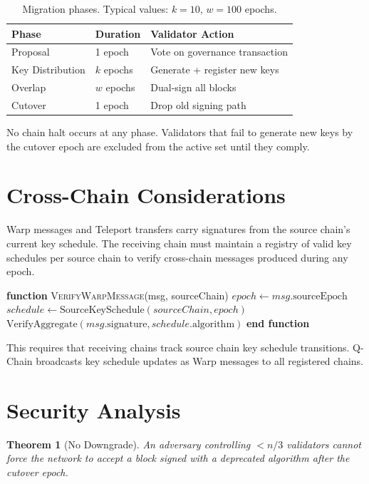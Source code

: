 \documentclass[11pt]{article}
\newtheorem{theorem}{Theorem}
\begin{document}
\begin{table}[h]
\centering
\begin{tabular}{@{}lll@{}}
\toprule
\textbf{Phase} & \textbf{Duration} & \textbf{Validator Action} \\
\midrule
Proposal & 1 epoch & Vote on governance transaction \\
Key Distribution & $k$ epochs & Generate + register new keys \\
Overlap & $w$ epochs & Dual-sign all blocks \\
Cutover & 1 epoch & Drop old signing path \\
\bottomrule
\end{tabular}
\caption{Migration phases. Typical values: $k=10$, $w=100$ epochs.}
\label{tab:migration}
\end{table}

No chain halt occurs at any phase. Validators that fail to generate new keys by the cutover epoch are excluded from the active set until they comply.

\section{Cross-Chain Considerations}

Warp messages and Teleport transfers carry signatures from the source chain's current key schedule. The receiving chain must maintain a registry of valid key schedules per source chain to verify cross-chain messages produced during any epoch.

\begin{algorithmic}[1]
\State \textbf{function} \textsc{VerifyWarpMessage}(msg, sourceChain)
\State $epoch \gets msg.\text{sourceEpoch}$
\State $schedule \gets \text{SourceKeySchedule}(sourceChain, epoch)$
\State \Return $\text{VerifyAggregate}(msg.\text{signature}, schedule.\text{algorithm})$
\State \textbf{end function}
\end{algorithmic}

This requires that receiving chains track source chain key schedule transitions. Q-Chain broadcasts key schedule updates as Warp messages to all registered chains.

\section{Security Analysis}

\begin{theorem}[No Downgrade]
An adversary controlling $< n/3$ validators cannot force the network to accept a block signed with a deprecated algorithm after the cutover epoch.
\end{theorem}
\end{document}
